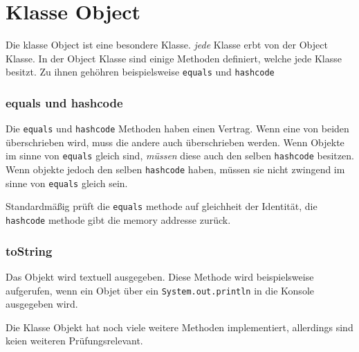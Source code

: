\chapter{Klasse Object}
\label{chap:Klasse Object}

Die klasse Object ist eine besondere Klasse. \textit{jede} Klasse erbt von der
Object Klasse. In der Object Klasse sind einige Methoden definiert, welche jede
Klasse besitzt. Zu ihnen gehöhren beispielsweise
\lstinline{equals} und \lstinline{hashcode}

\subsection{equals und hashcode}

Die \lstinline{equals} und \lstinline{hashcode} Methoden haben einen Vertrag.
Wenn eine von beiden überschrieben wird, muss die andere auch überschrieben
werden. Wenn Objekte im sinne von
\lstinline{equals} gleich sind, \textit{müssen} diese auch den selben
\lstinline{hashcode} besitzen. Wenn objekte jedoch den selben \lstinline{hashcode}
haben, müssen sie nicht zwingend im sinne von \lstinline{equals} gleich sein.

Standardmäßig prüft die
\lstinline{equals} methode auf gleichheit der Identität, die \lstinline{hashcode}
methode gibt die memory addresse zurück.

\subsection{toString}

Das Objekt wird textuell ausgegeben. Diese Methode wird beispielsweise
aufgerufen, wenn ein Objet über ein \lstinline{System.out.println} in die
Konsole ausgegeben wird.

Die Klasse Objekt hat noch viele weitere Methoden implementiert, allerdings
sind keien weiteren Prüfungsrelevant.